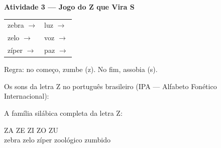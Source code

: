 \begin{consolidacao}
\textbf{Atividade 3 --- Jogo do Z que Vira S}


\begin{center}
\begin{tabular}{ll}
zebra \quad $\rightarrow$ \underline{\hspace{2cm}} & luz \quad $\rightarrow$ \underline{\hspace{2cm}} \\
zelo \quad $\rightarrow$ \underline{\hspace{2cm}} & voz \quad $\rightarrow$ \underline{\hspace{2cm}} \\
z\'iper \quad $\rightarrow$ \underline{\hspace{2cm}} & paz \quad $\rightarrow$ \underline{\hspace{2cm}}
\end{tabular}
\end{center}
Regra: no come\c{c}o, zumbe (z). No fim, assobia (s).

\end{consolidacao}


\begin{sonsdaletra}
Os sons da letra Z no portugu\^es{} brasileiro (IPA --- Alfabeto Fon\'etico Internacional):

\end{sonsdaletra}


\begin{familiasilabica}
A fam\'ilia sil\'abica completa da letra Z:

\begin{center}
ZA \quad ZE \quad ZI \quad ZO \quad ZU \\[0.5em] zebra \quad zelo \quad z\'iper \quad zool\'ogico \quad zumbido
\end{center}
\end{familiasilabica}


